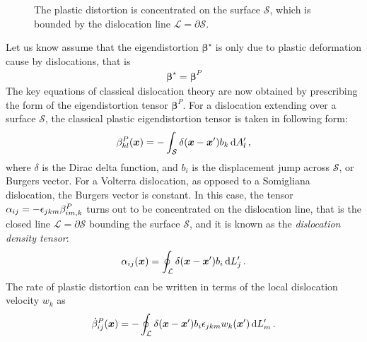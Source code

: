  \begin{figure}[t]
\centering
{}
\caption{The plastic distortion is concentrated on the surface $\mathcal{S}$, which is bounded by the dislocation line $\mathcal{L}=\partial\mathcal{S}$.}
\label{fig:dislocation_loop} 
\end{figure}
Let us know assume that the eigendistortion $\bm \beta^\star$ is only due to plastic deformation cause by dislocations, that is
\begin{align}
\bm \beta^\star=\bm \beta^P
\end{align}
The key equations of classical dislocation theory are now obtained by prescribing  the form of the eigendistortion tensor $\bm \beta^P$. For a dislocation extending over a surface $\mathcal{S}$,  the classical plastic eigendistortion tensor is taken in following form:
\begin{align}
\beta^P_{kl}(\bm x)=-\int_\mathcal{S}\delta(\bm x-\bm x')b_k\,\text{d}A_l'\, ,
\label{dislocation_distortion_classical}
\end{align}
where $\delta$ is the Dirac delta function, and $b_i$ is the displacement jump across $\mathcal{S}$, or Burgers vector. For a Volterra dislocation, as opposed to a Somigliana dislocation,  the Burgers vector is constant. In this case,  the  tensor $\alpha_{ij}=-\epsilon_{jkm}\beta^P_{im,k}$ turns out to be concentrated on the dislocation line, that is the closed line $\mathcal{L}=\partial\mathcal{S}$ bounding the surface $\mathcal{S}$, and it is known as the \textit{dislocation density tensor}:
\begin{align}
\alpha_{ij}(\bm x)=\oint_{\mathcal{L}}\delta(\bm x-\bm x')b_i\,\text{d}L_j'\, .
\label{dislocation_alpha_classical}
\end{align}
The rate of plastic distortion can be written in terms of the local dislocation velocity $w_k$ as
\begin{align}
\dot{\beta}^P_{ij}(\bm x)
=-\oint_{\mathcal{L}}\delta(\bm x-\bm x')b_i\epsilon_{jkm}w_k(\bm x')\,\text{d}L_m'\,.
\label{plasticDistortionRateLoop}
\end{align}


